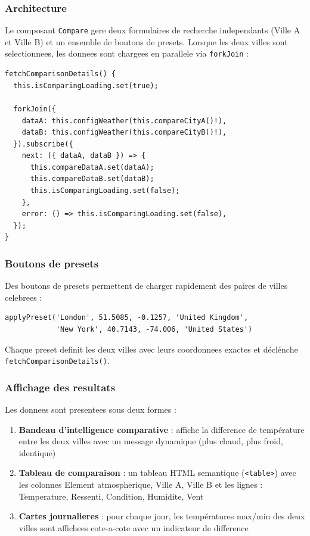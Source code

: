 \documentclass[12pt,a4paper]{article}
\begin{document}
\subsubsection{Architecture}

Le composant \texttt{Compare} gere deux formulaires de recherche independants (Ville A et Ville B) et un ensemble de boutons de presets. Lorsque les deux villes sont selectionnees, les donnees sont chargees en parallele via \texttt{forkJoin} :

\begin{lstlisting}[style=angular, caption={Chargement parallele pour la comparaison}]
fetchComparisonDetails() {
  this.isComparingLoading.set(true);

  forkJoin({
    dataA: this.configWeather(this.compareCityA()!),
    dataB: this.configWeather(this.compareCityB()!),
  }).subscribe({
    next: ({ dataA, dataB }) => {
      this.compareDataA.set(dataA);
      this.compareDataB.set(dataB);
      this.isComparingLoading.set(false);
    },
    error: () => this.isComparingLoading.set(false),
  });
}
\end{lstlisting}

\subsubsection{Boutons de presets}

Des boutons de presets permettent de charger rapidement des paires de villes celebrees :

\begin{lstlisting}[style=angular, caption={Preset de comparaison}]
applyPreset('London', 51.5085, -0.1257, 'United Kingdom',
            'New York', 40.7143, -74.006, 'United States')
\end{lstlisting}

Chaque preset definit les deux villes avec leurs coordonnees exactes et déclénche \texttt{fetchComparisonDetails()}.

\subsubsection{Affichage des resultats}

Les donnees sont presentees sous deux formes :

\begin{enumerate}[nosep]
    \item \textbf{Bandeau d'intelligence comparative} : affiche la difference de température entre les deux villes avec un message dynamique (\og{}plus chaud\fg{}, \og{}plus froid\fg{}, \og{}identique\fg{})
    \item \textbf{Tableau de comparaison} : un tableau HTML semantique (\texttt{<table>}) avec les colonnes \og{}Element atmospherique\fg{}, \og{}Ville A\fg{}, \og{}Ville B\fg{} et les lignes : Temperature, Ressenti, Condition, Humidite, Vent
    \item \textbf{Cartes journalieres} : pour chaque jour, les températures max/min des deux villes sont affichees cote-a-cote avec un indicateur de difference
\end{enumerate}
\end{document}

